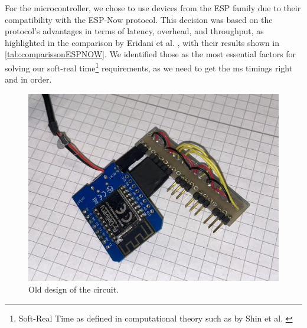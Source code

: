 \begin{table}
    \centering
    \caption{Comparison of Wi-Fi, Bluetooth and Esp-Now \cite{eridani2021comparative}.\\EE stands for Energy Efficiency, R stands for receiver and T for transmitter.}
    \label{tab:comparissonESPNOW}
\end{table}

For the microcontroller, we chose to use devices from the ESP family due to their compatibility with the ESP-Now protocol. This decision was based on the protocol's advantages in terms of latency, overhead, and throughput, as highlighted in the comparison by Eridani et al. \cite{eridani2021comparative}, with their results shown in \autoref{tab:comparissonESPNOW}. We identified those as the most essential factors for solving our soft-real time\footnote{Soft-Real Time as defined in computational theory such as by Shin et al. \cite{shin1994real}} requirements, as we need to get the ms timings right and in order.

\begin{figure}
    \centering
    \includegraphics[width=0.5\linewidth]{src/pictures/GloveDesigns/oldDesign.jpg}
    \caption{Old design of the circuit.}
    \label{fig:oldDesign}
\end{figure}

